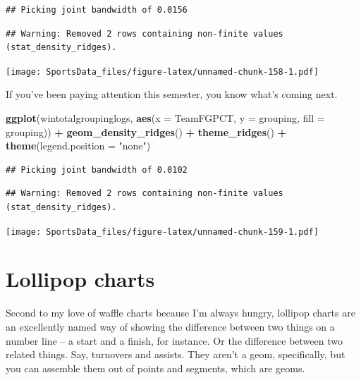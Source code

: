 \documentclass[]{book}
\newenvironment{Shaded}{\begin{snugshade}}{\end{snugshade}}
\newcommand{\DataTypeTok}[1]{\textcolor[rgb]{0.13,0.29,0.53}{#1}}
\newcommand{\KeywordTok}[1]{\textcolor[rgb]{0.13,0.29,0.53}{\textbf{#1}}}
\newcommand{\NormalTok}[1]{#1}
\newcommand{\OperatorTok}[1]{\textcolor[rgb]{0.81,0.36,0.00}{\textbf{#1}}}
\newcommand{\StringTok}[1]{\textcolor[rgb]{0.31,0.60,0.02}{#1}}
\begin{document}
\begin{verbatim}
## Picking joint bandwidth of 0.0156
\end{verbatim}

\begin{verbatim}
## Warning: Removed 2 rows containing non-finite values (stat_density_ridges).
\end{verbatim}

\texttt{[image: SportsData\_files/figure-latex/unnamed-chunk-158-1.pdf]}

If you've been paying attention this semester, you know what's coming next.

\begin{Shaded}
\begin{Highlighting}[]
\KeywordTok{ggplot}\NormalTok{(wintotalgroupinglogs, }\KeywordTok{aes}\NormalTok{(}\DataTypeTok{x =}\NormalTok{ TeamFGPCT, }\DataTypeTok{y =}\NormalTok{ grouping, }\DataTypeTok{fill =}\NormalTok{ grouping)) }\OperatorTok{+}
\StringTok{  }\KeywordTok{geom_density_ridges}\NormalTok{() }\OperatorTok{+}
\StringTok{  }\KeywordTok{theme_ridges}\NormalTok{() }\OperatorTok{+}\StringTok{ }
\StringTok{  }\KeywordTok{theme}\NormalTok{(}\DataTypeTok{legend.position =} \StringTok{"none"}\NormalTok{)}
\end{Highlighting}
\end{Shaded}

\begin{verbatim}
## Picking joint bandwidth of 0.0102
\end{verbatim}

\begin{verbatim}
## Warning: Removed 2 rows containing non-finite values (stat_density_ridges).
\end{verbatim}

\texttt{[image: SportsData\_files/figure-latex/unnamed-chunk-159-1.pdf]}

\hypertarget{lollipop-charts}{%
\chapter{Lollipop charts}\label{lollipop-charts}}

Second to my love of waffle charts because I'm always hungry, lollipop charts are an excellently named way of showing the difference between two things on a number line -- a start and a finish, for instance. Or the difference between two related things. Say, turnovers and assists. They aren't a geom, specifically, but you can assemble them out of points and segments, which are geoms.
\end{document}
